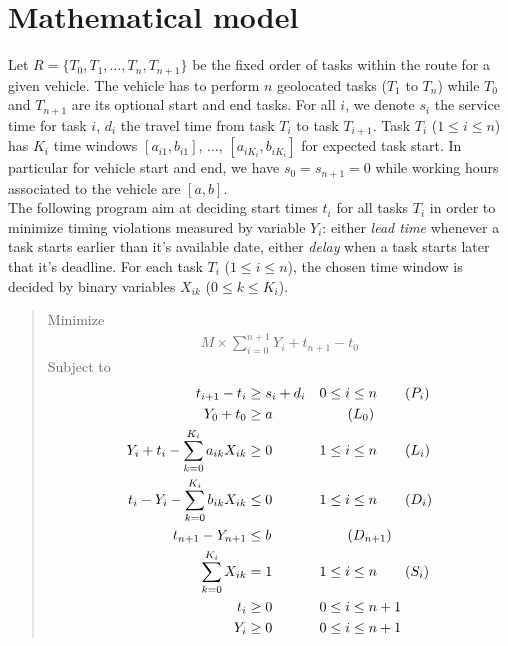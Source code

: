 \documentclass{article}
\begin{document}
\section{Mathematical model}

Let $R=\{T_0, T_1, \ldots, T_n, T_{n + 1}\}$ be the fixed order of
tasks within the route for a given vehicle. The vehicle has to perform
$n$ geolocated tasks ($T_1$ to $T_n$) while $T_0$ and $T_{n + 1}$ are
its optional start and end tasks. For all $i$, we denote $s_i$ the
service time for task $i$, $d_i$ the travel time from task $T_i$ to
task $T_{i + 1}$. Task $T_i$ ($1\leq i \leq n$) has $K_i$ time windows
$[a_{i1}, b_{i1}]$, $\dots$, $[a_{iK_i}, b_{iK_i}]$ for expected task
start. In particular for vehicle start and end, we have
$s_0 = s_{n + 1} = 0$ while working hours associated to the vehicle
are $[a, b]$.\\

The following program aim at deciding start times $t_i$ for all tasks
$T_i$ in order to minimize timing violations measured by variable
$Y_i$: either \textit{lead time} whenever a task starts earlier than
it's available date, either \textit{delay} when a task starts later
that it's deadline. For each task $T_i$ ($1\leq i\leq n$), the chosen
time window is decided by binary variables $X_{ik}$
($0\leq k \leq K_i$).


\begin{quote}
  Minimize
  \begin{align}
    M \times \sum_{i = 0}^{n + 1} Y_i + t_{n +1} - t_0 \label{obj}\tag{Obj}
  \end{align}
  Subject to
  \begin{align}
    t_{i + 1} - t_i &\geq s_i + d_i && 0 \leq i \leq n\label{precedence}\tag{$P_i$}\\
    Y_0 + t_0 &\geq a &&  \label{lead_start}\tag{$L_0$}\\
    Y_i + t_i - \sum_{k = 0}^{K_i}a_{ik}X_{ik}&\geq 0 && 1 \leq i \leq n \label{lead}\tag{$L_i$}\\
    t_i - Y_i - \sum_{k = 0}^{K_i}b_{ik}X_{ik} &\leq 0 && 1 \leq i \leq n \label{delay}\tag{$D_i$}\\
    t_{n + 1} - Y_{n + 1} &\leq b && \label{delay_end}\tag{$D_{n + 1}$}\\
    \sum_{k = 0}^{K_i}X_{ik} &= 1 && 1 \leq i \leq n \label{tw_sum}\tag{$S_i$}\\
    t_i &\geq 0 && 0 \leq i \leq n + 1 \nonumber\\
    Y_i &\geq 0 && 0 \leq i \leq n + 1 \nonumber
  \end{align}
\end{quote}
\end{document}
